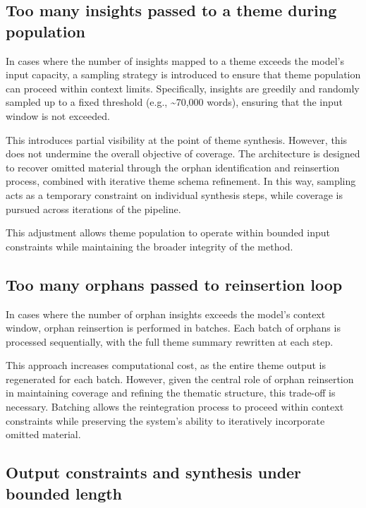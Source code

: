 \documentclass[
  11pt,
]{article}
\begin{document}
\subsection{Too many insights passed to a theme during
population}\label{too-many-insights-passed-to-a-theme-during-population}

In cases where the number of insights mapped to a theme exceeds the
model's input capacity, a sampling strategy is introduced to ensure that
theme population can proceed within context limits. Specifically,
insights are greedily and randomly sampled up to a fixed threshold
(e.g., \textasciitilde70,000 words), ensuring that the input window is
not exceeded.

This introduces partial visibility at the point of theme synthesis.
However, this does not undermine the overall objective of coverage. The
architecture is designed to recover omitted material through the orphan
identification and reinsertion process, combined with iterative theme
schema refinement. In this way, sampling acts as a temporary constraint
on individual synthesis steps, while coverage is pursued across
iterations of the pipeline.

This adjustment allows theme population to operate within bounded input
constraints while maintaining the broader integrity of the method.

\subsection{Too many orphans passed to reinsertion loop}\label{too-many-orphans-passed-to-reinsertion-loop}

In cases where the number of orphan insights exceeds the model's context
window, orphan reinsertion is performed in batches. Each batch of
orphans is processed sequentially, with the full theme summary rewritten
at each step.

This approach increases computational cost, as the entire theme output
is regenerated for each batch. However, given the central role of orphan
reinsertion in maintaining coverage and refining the thematic structure,
this trade-off is necessary. Batching allows the reintegration process
to proceed within context constraints while preserving the system's
ability to iteratively incorporate omitted material.

\subsection{Output constraints and synthesis under bounded
length}\label{output-constraints-and-synthesis-under-bounded-length}
\end{document}
